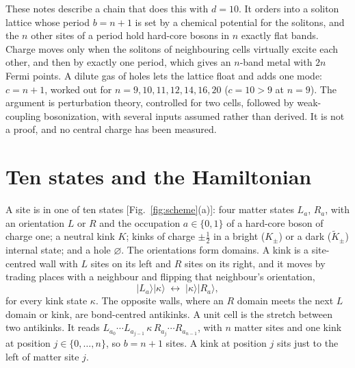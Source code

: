 \documentclass[11pt]{article}
\newcommand{\ket}[1]{|#1\rangle}
\newcommand{\Kt}{\tilde K}
\begin{document}
These notes describe a chain that does this with $d=10$. It orders into a soliton lattice whose period $b=n+1$ is set by a chemical potential for the solitons, and the $n$ other sites of a period hold hard-core bosons in $n$ exactly flat bands. Charge moves only when the solitons of neighbouring cells virtually excite each other, and then by exactly one period, which gives an $n$-band metal with $2n$ Fermi points. A dilute gas of holes lets the lattice float and adds one mode: $c=n+1$, worked out for $n=9,10,11,12,14,16,20$ ($c=10>9$ at $n=9$). The argument is perturbation theory, controlled for two cells, followed by weak-coupling bosonization, with several inputs assumed rather than derived. It is not a proof, and no central charge has been measured.

\section{Ten states and the Hamiltonian}

A site is in one of ten states [Fig.~\ref{fig:scheme}(a)]: four matter states $L_a$, $R_a$, with an orientation $L$ or $R$ and the occupation $a\in\{0,1\}$ of a hard-core boson of charge one; a neutral kink $K$; kinks of charge $\pm\tfrac12$ in a bright ($K_\pm$) or a dark ($\Kt_\pm$) internal state; and a hole $\varnothing$. The orientations form domains. A kink is a site-centred wall with $L$ sites on its left and $R$ sites on its right, and it moves by trading places with a neighbour and flipping that neighbour's orientation,
\begin{equation}
\ket{L_a}\ket{\kappa}\;\longleftrightarrow\;\ket{\kappa}\ket{R_a},
\label{eq:move}
\end{equation}
for every kink state $\kappa$. The opposite walls, where an $R$ domain meets the next $L$ domain or kink, are bond-centred antikinks. A unit cell is the stretch between two antikinks. It reads $L_{a_0}\cdots L_{a_{j-1}}\,\kappa\,R_{a_j}\cdots R_{a_{n-1}}$, with $n$ matter sites and one kink at position $j\in\{0,\dots,n\}$, so $b=n+1$ sites. A kink at position $j$ sits just to the left of matter site $j$.
\end{document}
